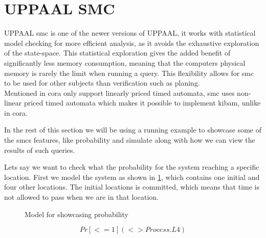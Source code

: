 
\section{UPPAAL SMC}\label{sec:smc}
UPPAAL \gls{smc} is one of the newer versions of UPPAAL, it works with statistical model checking for more efficient analysis, as it avoids the exhaustive exploration of the state-space. This statistical exploration gives the added benefit of significantly less memory consumption\cite{cs_smc}, meaning that the computers physical memory is rarely the limit when running a query. This flexibility allows for \gls{smc} to be used for other subjects than verification such as planing\cite{cs_smc}. \\
Mentioned in \gls{cora} only support linearly priced timed automata, \gls{smc} uses non-linear priced timed automata which makes it possible to implement \gls{kibam}, unlike in \gls{cora}.

In the rest of this section we will be using a running example to showcase some of the \gls{smc}s features, like probability and simulate along with how we can view the results of such queries.

Lets say we want to check what the probability for the system reaching a specific location. First we model the system as shown in \cref{fig:example}, which contains one initial and four other locations. The initial locations is committed, which means that time is not allowed to pass when we are in that location.

\begin{figure}
	\centering
	\caption{Model for showcasing probability}
	\label{fig:example}
\end{figure}

\begin{equation}\label{eq:q1}
Pr[<=1](<> Process.L4)
\end{equation}

